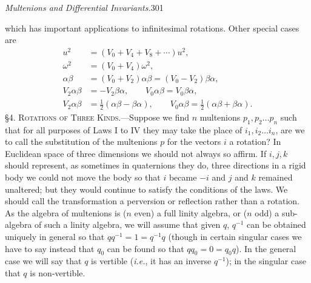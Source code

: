 \documentclass[11pt]{article}
\begin{document}
\newpage\thispagestyle{empty}\begin{center}\textit{Multenions and Differential Invariants.}\hfill 301\end{center}
which has important applications to infinitesimal rotations. Other special cases are
\begin{align}u^2&=(V_0+V_4+V_8+\cdots)u^2,\tag{5}\\\omega^2&=(V_0+V_4)\omega^2,\tag{6}\\\alpha\beta&=(V_0+V_2)\alpha\beta=(V_0-V_2)\beta\alpha,\tag{7}\\V_2\alpha\beta&=-V_2\beta\alpha,\qquad V_0\alpha\beta=V_0\beta\alpha,\tag{8}\\V_2\alpha\beta&=\tfrac12(\alpha\beta-\beta\alpha),\qquad V_0\alpha\beta=\tfrac12(\alpha\beta+\beta\alpha).\tag{9}\end{align}
\noindent\textsc{\S 4. Rotations of Three Kinds.}---Suppose we find $n$ multenions $p_1,p_2\ldots p_n$ such that for all purposes of Laws I to IV they may take the place of $i_1,i_2\ldots i_n$, are we to call the substitution of the multenions $p$ for the vectors $i$ a rotation? In Euclidean space of three dimensions we should not always so affirm. If $i,j,k$ should represent, as sometimes in quaternions they do, three directions in a rigid body we could not move the body so that $i$ became $-i$ and $j$ and $k$ remained unaltered; but they would continue to satisfy the conditions of the laws. We should call the transformation a perversion or reflection rather than a rotation. As the algebra of multenions is ($n$ even) a full linity algebra, or ($n$ odd) a sub-algebra of such a linity algebra, we will assume that given $q$, $q^{-1}$ can be obtained uniquely in general so that $qq^{-1}=1=q^{-1}q$ (though in certain singular cases we have to say instead that $q_0$ can be found so that $qq_0=0=q_0q$). In the general case we will say that $q$ is vertible (\emph{i.e.}, it has an inverse $q^{-1}$); in the singular case that $q$ is non-vertible.
\end{document}

